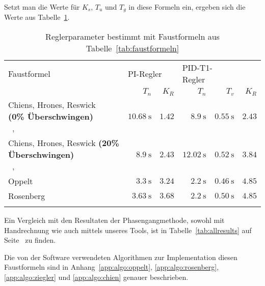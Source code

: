 Setzt man die Werte f\"ur $K_s$, $T_u$ und $T_g$ in diese Formeln ein, ergeben
sich die Werte aus Tabelle~\ref{tab:ff_results}.

\begin{longtable}{p{50mm}rrrrr}
    \toprule


    Faustformel
    &
    \multicolumn{2}{l}{PI-Regler}
    &
    \multicolumn{2}{l}{PID-T1-Regler}
    \\

    &
    $T_n$
    &
    $K_R$
    &
    $T_n$
    &
    $T_v$
    &
    $K_R$
    \\

    \midrule

    \endhead
    \endfoot
    \endlastfoot


    \pbox{45mm}{Chiens, Hrones, Reswick \\ \small{\textbf{(0\% \"Uberschwingen)}} \\~\cite{ref:chiens_tsn},~\cite{ref:chiens_wiki}}
    &
    $\SI{10.68}{\second}$
    &
    $1.42$
    &
    $\SI{8.9}{\second}$
    &
    $\SI{0.55}{\second}$
    &
    $2.43$
    \\

    \addlinespace[1em]

    \pbox{45mm}{Chiens, Hrones, Reswick \small{\textbf{(20\% \"Uberschwingen)}} \\~\cite{ref:chiens_tsn},~\cite{ref:chiens_wiki}}
    &
    $\SI{8.9}{\second}$
    &
    $2.43$
    &
    $\SI{12.02}{\second}$
    &
    $\SI{0.52}{\second}$
    &
    $3.84$
    \\

    \addlinespace[1em]

    Oppelt~\cite{ref:op_ros_zieg}
    &
    $\SI{3.3}{\second}$
    &
    $3.24$
    &
    $\SI{2.2}{\second}$
    &
    $\SI{0.46}{\second}$
    &
    $4.85$
    \\

    \addlinespace[1em]

    Rosenberg~\cite{ref:op_ros_zieg}
    &
    $\SI{3.63}{\second}$
    &
    $3.68$
    &
    $\SI{2.2}{\second}$
    &
    $\SI{0.50}{\second}$
    &
    $4.85$
    \\

    \addlinespace[1em]

    \bottomrule
    \caption{Reglerparameter bestimmt mit Faustformeln aus Tabelle~\ref{tab:faustformeln}}
\label{tab:ff_results}
\end{longtable}

Ein   Vergleich    mit   den   Resultaten   der    Phasengangmethode,   sowohl
mit    Handrechnung    wie    auch    mittels   unseres    Tools,    ist    in
Tabelle~\ref{tab:allresults} auf Seite~\pageref{tab:allresults} zu finden.

Die  von  der  Software  verwendeten  Algorithmen  zur  Implementation  diesen
Faustformeln  sind in  Anhang~\ref{app:algo:oppelt}, \ref{app:algo:rosenberg},
\ref{app:algo:ziegler} und \ref{app:algo:chien} genauer beschrieben.

